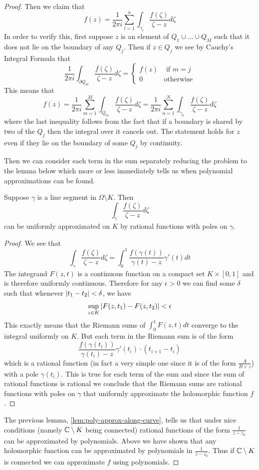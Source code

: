 \begin{proof}
    Then we claim that 
    $$f(z) = \frac{1}{2\pi i} \sum_{l = 1}^n \int_{\gamma_l} \frac{f(\zeta)}{\zeta - z} d\zeta$$
    In order to verify this, first suppose $z$ is an element of $Q_1 \cup \dots \cup Q_M$ such that it does not lie on the boundary of any $Q_j$. Then if $z \in Q_j$ we see by Cauchy's Integral Formula that
    $$ \frac{1}{2\pi i} \int_{\partial Q_m} \frac{f(\zeta)}{\zeta - z}d\zeta = 
    \begin{cases}
    f(z) &\text{ if } m = j\\
    0 &\text{otherwise}
    \end{cases}$$
    This means that 
    $$f(z) = \frac{1}{2\pi i} \sum_{m = 1}^M \int_{Q_m} \frac{f(\zeta)}{\zeta - z}d\zeta = \frac{1}{2\pi i} \sum_{n = 1}^N \int_{\gamma_n} \frac{f(\zeta)}{\zeta - z}d\zeta$$
    where the last inequality follows from the fact that if a boundary is shared by two of the $Q_j$ then the integral over it cancels out. The statement holds for $z$ even if they lie on the boundary of some $Q_j$ by continuity.

    Then we can consider each term in the sum separately reducing the problem to the lemma below which more or less immediately tells us when polynomial approximations can be found.
    \begin{lemma}
        Suppose $\gamma$ is a line segment in $\Omega \setminus K$. Then
        $$\int_{\gamma} \frac{f(\zeta)}{\zeta - z} d\zeta$$
        can be uniformly approximated on $K$ by rational functions with poles on $\gamma$.
    \end{lemma}
    \begin{proof}
        We see that
        $$\int_\gamma \frac{f(\zeta)}{\zeta - z}d\zeta = \int_0^1 \frac{f(\gamma(t))}{\gamma(t) - z}\gamma'(t) dt$$
    The integrand $F(z, t)$ is a continuous function on a compact set $K \times [0, 1]$ and is therefore uniformly continuous. Therefore for any $\epsilon > 0$ we can find some $\delta$ such that whenever $\left|t_1 - t_2\right| < \delta$, we have
    $$\sup_{z \in K} \left|F(z, t_1) - F(z, t_2)\right| < \epsilon$$
    This exactly means that the Riemann sums of $\int_0^1 F(z, t) dt$ converge to the integral uniformly on $K$. But each term in the Riemann sum is of the form
    $$ \frac{f(\gamma(t_i))}{\gamma(t_i) - z}\gamma'(t_i) \cdot (t_{i + 1} - t_i) $$
    which is a rational function (in fact a very simple one since it is of the form $\frac{A}{B + z}$) with a pole $\gamma(t_i)$. This is true for each term of the sum and since the sum of rational functions is rational we conclude that the Riemann sums are rational functions with poles on $\gamma$ that uniformly approximate the holomorphic function $f$.
    \end{proof}

    The previous lemma, \autoref{lem:poly-approx-along-curve}, tells us that under nice conditions (namely $\mathbb{C} \setminus K$ being connected) rational functions of the form $\frac{1}{z - z_0}$ can be approximated by polynomials. Above we have shown that any holomorphic function can be approximated by polynomials in $\frac{1}{z - z_0}$. Thus if $\mathbb{C} \setminus K$ is connected we can approximate $f$ using polynomials.
\end{proof}